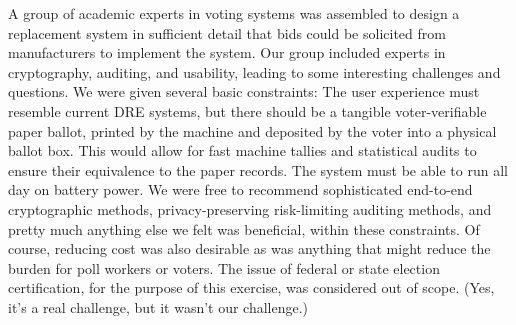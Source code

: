 A group of academic experts in voting systems was assembled 
to design a replacement system in sufficient
detail that bids could be solicited from manufacturers to implement
the system. Our group included experts in cryptography, auditing, and
usability, leading to some interesting challenges and questions. We
were given several basic constraints: The user experience must
resemble current DRE systems, but there should be a tangible
voter-verifiable paper ballot, printed by the machine and deposited by
the voter into a physical ballot box. This would allow for fast machine
tallies and statistical audits to ensure their equivalence to the
paper records. The system must be able to run all day on battery power.
We were free to recommend sophisticated end-to-end
cryptographic methods, privacy-preserving risk-limiting auditing
methods, and pretty much anything else we felt was beneficial, within
these constraints. Of course, reducing cost was also desirable as was
anything that might reduce the burden for poll workers or voters. The
issue of federal or state election certification, for the purpose of
this exercise, was considered out of scope. (Yes, it's a real
challenge, but it wasn't our challenge.)

